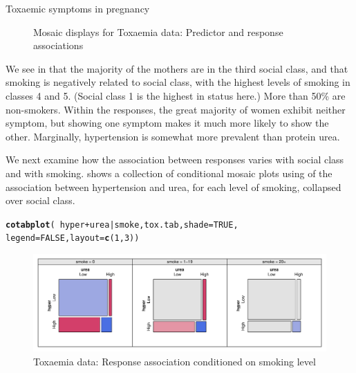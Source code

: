 \documentclass[11pt]{book}\usepackage[]{graphicx}\usepackage[]{color}
\makeatletter
\newcommand{\hlnum}[1]{\textcolor[rgb]{0.686,0.059,0.569}{#1}}%
\newcommand{\hlopt}[1]{\textcolor[rgb]{0,0,0}{#1}}%
\newcommand{\hlstd}[1]{\textcolor[rgb]{0.345,0.345,0.345}{#1}}%
\newcommand{\hlkwc}[1]{\textcolor[rgb]{0.333,0.667,0.333}{#1}}%
\newcommand{\hlkwd}[1]{\textcolor[rgb]{0.737,0.353,0.396}{\textbf{#1}}}%
\newenvironment{kframe}{%
 \def\at@end@of@kframe{}%
 \ifinner\ifhmode%
  \def\at@end@of@kframe{\end{minipage}}%
  \begin{minipage}{\columnwidth}%
 \fi\fi%
 \def\FrameCommand##1{\hskip\@totalleftmargin \hskip-\fboxsep
 \colorbox{shadecolor}{##1}\hskip-\fboxsep
     \hskip-\linewidth \hskip-\@totalleftmargin \hskip\columnwidth}%
 \MakeFramed {\advance\hsize-\width
   \@totalleftmargin\z@ \linewidth\hsize
   \@setminipage}}%
 {\par\unskip\endMakeFramed%
 \at@end@of@kframe}
\newenvironment{knitrout}{}{} %
\renewenvironment{knitrout}{\small\renewcommand{\baselinestretch}{.85}}{} %
\makeatother
\begin{document}
\begin{Example}[toxaemia]{Toxaemic symptoms in pregnancy}
\begin{knitrout}
\begin{figure}[!htbp]
\caption[Mosaic displays for Toxaemia data]{Mosaic displays for Toxaemia data: Predictor and response associations\label{fig:tox-mosaic1}}
\end{figure}


\end{knitrout}
We see in  that the majority of the mothers are in the
third social class, and that smoking is negatively related to social
class, with the highest levels of smoking in classes 4 and 5.
(Social class 1 is the highest in status here.)
More than 50\% are non-smokers.
Within the responses, the great majority of women exhibit neither symptom,
but showing one symptom makes it much more likely to show the other.
Marginally, hypertension is somewhat more prevalent than protein urea.

We next examine how the association between responses varies with
social class and with smoking.
  shows a collection of conditional
mosaic plots using  of the association between hypertension and urea,
for each level of smoking, collapsed over social class.

\begin{knitrout}
\color{fgcolor}\begin{kframe}
\begin{alltt}
\hlkwd{cotabplot}\hlstd{(}\hlopt{~}\hlstd{hyper} \hlopt{+} \hlstd{urea} \hlopt{|} \hlstd{smoke, tox.tab,} \hlkwc{shade}\hlstd{=}\hlnum{TRUE}\hlstd{,}
          \hlkwc{legend}\hlstd{=}\hlnum{FALSE}\hlstd{,} \hlkwc{layout}\hlstd{=}\hlkwd{c}\hlstd{(}\hlnum{1}\hlstd{,}\hlnum{3}\hlstd{))}
\end{alltt}
\end{kframe}\begin{figure}[!htbp]


\centerline{\includegraphics[width=1.1\textwidth]{ch08/fig/tox-mosaic2-1} }

\caption[Toxaemia data]{Toxaemia data: Response association conditioned on smoking level\label{fig:tox-mosaic2}}
\end{figure}



\end{knitrout}
\end{Example}
\end{document}
